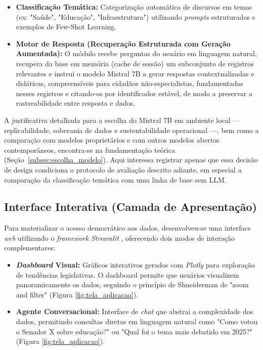 \begin{itemize}
    \item \textbf{Classificação Temática:} Categorização automática de discursos em temas (ex: "Saúde", "Educação", "Infraestrutura") utilizando \textit{prompts} estruturados e exemplos de Few-Shot Learning.

    \item \textbf{Motor de Resposta (Recuperação Estruturada com Geração Aumentada):} O módulo recebe perguntas do usuário em linguagem natural, recupera da base em memória (cache de sessão) um subconjunto de registros relevantes e instrui o modelo Mistral 7B a gerar respostas contextualizadas e didáticas, compreensíveis para cidadãos não-especialistas, fundamentadas nesses registros e citando-os por identificador estável, de modo a preservar a rastreabilidade entre resposta e dados.
\end{itemize}

A justificativa detalhada para a escolha do Mistral 7B em ambiente local --- replicabilidade, soberania de dados e sustentabilidade operacional ---, bem como a comparação com modelos proprietários e com outros modelos abertos contemporâneos, encontra-se na fundamentação teórica (Seção~\ref{subsec:escolha_modelo}). Aqui interessa registrar apenas que essa decisão de design condiciona o protocolo de avaliação descrito adiante, em especial a comparação da classificação temática com uma linha de base sem LLM.

\subsection{Interface Interativa (Camada de Apresentação)}

Para materializar o acesso democrático aos dados, desenvolveu-se uma interface \textit{web} utilizando o \textit{framework Streamlit} \cite{Streamlit2024}, oferecendo dois modos de interação complementares:

\begin{itemize}
    \item \textbf{\textit{Dashboard} Visual:} Gráficos interativos gerados com \textit{Plotly} \cite{Plotly2024} para exploração de tendências legislativas. O dashboard permite que usuários visualizem panoramicamente os dados, seguindo o princípio de Shneiderman \cite{Shneiderman1996} de "zoom and filter" (Figura \ref{fig:tela_aplicacao}).

    \item \textbf{Agente Conversacional:} Interface de \textit{chat} que abstrai a complexidade dos dados, permitindo consultas diretas em linguagem natural como "Como votou o Senador X sobre educação?" ou "Qual foi o tema mais debatido em 2025?" (Figura \ref{fig:tela_aplicacao}).
\end{itemize}

